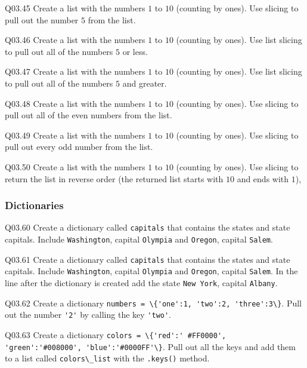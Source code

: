 \documentclass{book}
\newcommand{\passthrough}[1]{#1}
\begin{document}
Q03.45 Create a list with the numbers \(1\) to \(10\) (counting by
ones). Use slicing to pull out the number \(5\) from the list.

Q03.46 Create a list with the numbers \(1\) to \(10\) (counting by
ones). Use list slicing to pull out all of the numbers \(5\) or less.

Q03.47 Create a list with the numbers \(1\) to \(10\) (counting by
ones). Use list slicing to pull out all of the numbers \(5\) and
greater.

Q03.48 Create a list with the numbers \(1\) to \(10\) (counting by
ones). Use slicing to pull out all of the even numbers from the list.

Q03.49 Create a list with the numbers \(1\) to \(10\) (counting by
ones). Use slicing to pull out every odd number from the list.

Q03.50 Create a list with the numbers \(1\) to \(10\) (counting by
ones). Use slicing to return the list in reverse order (the returned
list starts with \(10\) and ends with \(1\)),
    




    
        \hypertarget{dictionaries}{%
\subsubsection{Dictionaries}\label{dictionaries}}

Q03.60 Create a dictionary called \passthrough{\lstinline!capitals!}
that contains the states and state capitals. Include
\passthrough{\lstinline!Washington!}, capital
\passthrough{\lstinline!Olympia!} and \passthrough{\lstinline!Oregon!},
capital \passthrough{\lstinline!Salem!}.

Q03.61 Create a dictionary called \passthrough{\lstinline!capitals!}
that contains the states and state capitals. Include
\passthrough{\lstinline!Washington!}, capital
\passthrough{\lstinline!Olympia!} and \passthrough{\lstinline!Oregon!},
capital \passthrough{\lstinline!Salem!}. In the line after the
dictionary is created add the state \passthrough{\lstinline!New York!},
capital \passthrough{\lstinline!Albany!}.

Q03.62 Create a dictionary
\passthrough{\lstinline!numbers = \{'one':1, 'two':2, 'three':3\}!}.
Pull out the number \passthrough{\lstinline!'2'!} by calling the key
\passthrough{\lstinline!'two'!}.

Q03.63 Create a dictionary
\passthrough{\lstinline!colors = \{'red':' #FF0000', 'green':'#008000', 'blue':'#0000FF'\}!}.
Pull out all the keys and add them to a list called
\passthrough{\lstinline!colors\_list!} with the
\passthrough{\lstinline!.keys()!} method.
\end{document}

